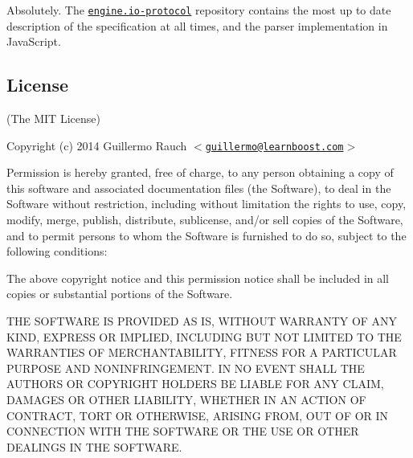 Absolutely. The \href{https://github.com/LearnBoost/engine.io-protocol}{\tt engine.\+io-\/protocol} repository contains the most up to date description of the specification at all times, and the parser implementation in Java\+Script.

\subsection*{License}

(The M\+IT License)

Copyright (c) 2014 Guillermo Rauch $<$\href{mailto:guillermo@learnboost.com}{\tt guillermo@learnboost.\+com}$>$

Permission is hereby granted, free of charge, to any person obtaining a copy of this software and associated documentation files (the \textquotesingle{}Software\textquotesingle{}), to deal in the Software without restriction, including without limitation the rights to use, copy, modify, merge, publish, distribute, sublicense, and/or sell copies of the Software, and to permit persons to whom the Software is furnished to do so, subject to the following conditions\+:

The above copyright notice and this permission notice shall be included in all copies or substantial portions of the Software.

T\+HE S\+O\+F\+T\+W\+A\+RE IS P\+R\+O\+V\+I\+D\+ED \textquotesingle{}AS IS\textquotesingle{}, W\+I\+T\+H\+O\+UT W\+A\+R\+R\+A\+N\+TY OF A\+NY K\+I\+ND, E\+X\+P\+R\+E\+SS OR I\+M\+P\+L\+I\+ED, I\+N\+C\+L\+U\+D\+I\+NG B\+UT N\+OT L\+I\+M\+I\+T\+ED TO T\+HE W\+A\+R\+R\+A\+N\+T\+I\+ES OF M\+E\+R\+C\+H\+A\+N\+T\+A\+B\+I\+L\+I\+TY, F\+I\+T\+N\+E\+SS F\+OR A P\+A\+R\+T\+I\+C\+U\+L\+AR P\+U\+R\+P\+O\+SE A\+ND N\+O\+N\+I\+N\+F\+R\+I\+N\+G\+E\+M\+E\+NT. IN NO E\+V\+E\+NT S\+H\+A\+LL T\+HE A\+U\+T\+H\+O\+RS OR C\+O\+P\+Y\+R\+I\+G\+HT H\+O\+L\+D\+E\+RS BE L\+I\+A\+B\+LE F\+OR A\+NY C\+L\+A\+IM, D\+A\+M\+A\+G\+ES OR O\+T\+H\+ER L\+I\+A\+B\+I\+L\+I\+TY, W\+H\+E\+T\+H\+ER IN AN A\+C\+T\+I\+ON OF C\+O\+N\+T\+R\+A\+CT, T\+O\+RT OR O\+T\+H\+E\+R\+W\+I\+SE, A\+R\+I\+S\+I\+NG F\+R\+OM, O\+UT OF OR IN C\+O\+N\+N\+E\+C\+T\+I\+ON W\+I\+TH T\+HE S\+O\+F\+T\+W\+A\+RE OR T\+HE U\+SE OR O\+T\+H\+ER D\+E\+A\+L\+I\+N\+GS IN T\+HE S\+O\+F\+T\+W\+A\+RE. 
